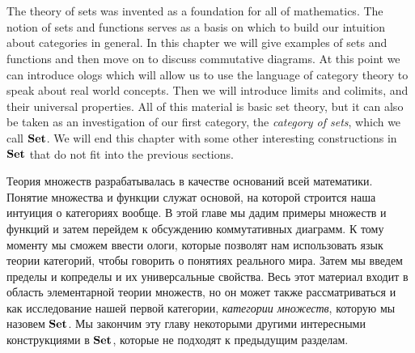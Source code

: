 \documentclass[CT4S-EN-RU]{subfiles}
\begin{document}
\chapter{}\label{chap:sets}

\begin{blockENG}
The theory of sets was invented as a foundation for all of mathematics. The notion of sets and functions serves as a basis on which to build our intuition about categories in general. In this chapter we will give examples of sets and functions and then move on to discuss commutative diagrams. At this point we can introduce ologs which will allow us to use the language of category theory to speak about real world concepts. Then we will introduce limits and colimits, and their universal properties. All of this material is basic set theory, but it can also be taken as an investigation of our first category, the {\em category of sets}, which we call ${\mathbf{Set}}$. We will end this chapter with some other interesting constructions in ${\mathbf{Set}}$ that do not fit into the previous sections.
\end{blockENG}

\begin{blockRUS}
Теория множеств разрабатывалась в качестве оснований всей математики. Понятие множества и функции служат основой, на которой строится наша интуиция о категориях вообще. В этой главе мы дадим примеры множеств и функций и затем перейдем к обсуждению коммутативных диаграмм. К тому моменту мы сможем ввести ологи, которые позволят нам использовать язык теории категорий, чтобы говорить о понятиях реального мира. Затем мы введем пределы и копределы и их универсальные свойства. Весь этот материал входит в область элементарной теории множеств, но он может также рассматриваться и как исследование нашей первой категории, {\em категории множеств}, которую мы назовем ${\mathbf{Set}}$. Мы закончим эту главу некоторыми другими интересными конструкциями в ${\mathbf{Set}}$, которые не подходят к предыдущим разделам.%
\end{blockRUS}
\end{document}
